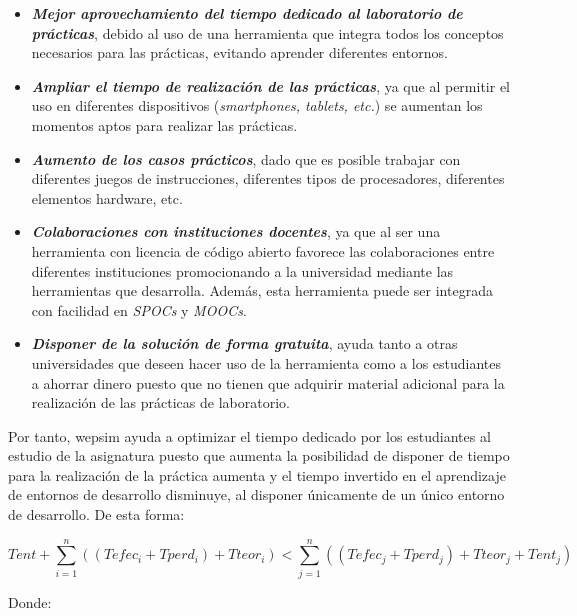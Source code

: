 \begin{itemize}

\item \textbf{\textit{Mejor aprovechamiento del tiempo dedicado al laboratorio de prácticas}}, debido al uso de una herramienta que integra todos los conceptos necesarios para las prácticas, evitando aprender diferentes entornos.

\item \textbf{\textit{Ampliar el tiempo de realización de las prácticas}}, ya que al permitir el uso en diferentes dispositivos (\emph{smartphones, tablets, etc.}) se aumentan los momentos aptos para realizar las prácticas.

\item \textbf{\textit{Aumento de los casos prácticos}}, dado que es posible trabajar con diferentes juegos de instrucciones, diferentes tipos de procesadores, diferentes elementos \gls{hardware}, etc.

\item \textbf{\textit{Colaboraciones con instituciones docentes}}, ya que al ser una herramienta con licencia de código abierto favorece las colaboraciones entre diferentes instituciones promocionando a la universidad mediante las herramientas que desarrolla. Además, esta herramienta puede ser integrada con facilidad en \emph{SPOCs} y \emph{MOOCs}.

\item \textbf{\textit{Disponer de la solución de forma gratuita}}, ayuda tanto a otras universidades que deseen hacer uso de la herramienta como a los estudiantes a ahorrar dinero puesto que no tienen que adquirir material adicional para la realización de las prácticas de laboratorio.

\end{itemize}

Por tanto, \acrshort{wepsim} ayuda a optimizar el tiempo dedicado por los estudiantes al estudio de la asignatura puesto que aumenta la posibilidad de disponer de tiempo para la realización de la práctica aumenta y el tiempo invertido en el aprendizaje de entornos de desarrollo disminuye, al disponer únicamente de un único entorno de desarrollo. De esta forma:

\begin{equation}
 Tent + \sum_{i=1}^{n}((Tefec_{i} + Tperd_{i}) + Tteor_{i}) < \sum_{j=1}^{n}((Tefec_{j} + Tperd_{j}) + Tteor_{j}+ Tent_{j})
\label{eq:tiempo_invertido}
\end{equation}

Donde:

